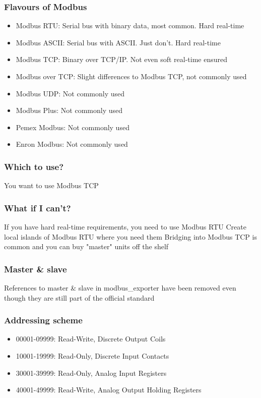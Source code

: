 \documentclass[aspectratio=169]{beamer}
\begin{document}
\begin{frame}
	\frametitle{Flavours of Modbus}
	\begin{itemize}
		\item Modbus RTU: Serial bus with binary data, most common. Hard real-time
		\item Modbus ASCII: Serial bus with ASCII. Just don't. Hard real-time
		\item Modbus TCP: Binary over TCP/IP. Not even soft real-time ensured
		\item Modbus over TCP: Slight differences to Modbus TCP, not commonly used
		\item Modbus UDP: Not commonly used
		\item Modbus Plus: Not commonly used
		\item Pemex Modbus: Not commonly used
		\item Enron Modbus: Not commonly used
	\end{itemize}
\end{frame}

\begin{frame}
	\frametitle{Which to use?}
	\centering
	\vfill
	You want to use Modbus TCP
	\vfill
\end{frame}

\begin{frame}
	\frametitle{What if I can't?}
	\centering
	\vfill
	If you have hard real-time requirements, you need to use Modbus RTU
	\vfill
	Create local islands of Modbus RTU where you need them
	\vfill
	Bridging into Modbus TCP is common and you can buy "master" units off the shelf
	\vfill
\end{frame}

\begin{frame}
	\frametitle{Master \& slave}
	\centering
	\vfill
	References to master \& slave in modbus\_exporter have been removed even though they are still part of the official standard
	\vfill
\end{frame}

\begin{frame}
	\frametitle{Addressing scheme}
	\begin{itemize}
		\item 00001-09999: Read-Write, Discrete Output Coils
		\item 10001-19999: Read-Only, Discrete Input Contacts
		\item 30001-39999: Read-Only, Analog Input Registers
		\item 40001-49999: Read-Write, Analog Output Holding Registers
	\end{itemize}
\end{frame}
\end{document}
